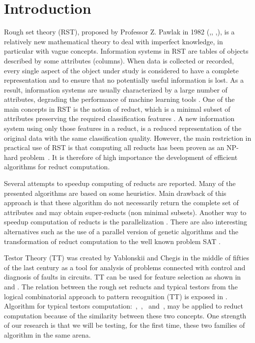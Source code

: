 \documentclass[11pt,authoryear]{elsarticle}
\begin{document}
\section{Introduction}
  Rough set theory (RST), proposed by Professor Z. Pawlak in 1982 (\cite{Pawlak81},\cite{Pawlak81-2},
  \cite{Pawlak82},\cite{Pawlak91}), is a relatively new mathematical theory 
  to deal with imperfect knowledge, in particular with vague concepts. Information systems in RST 
  are tables of objects described by some attributes (columns). 
  When data is collected or recorded, every single aspect of the object under study is considered 
  to have a complete representation and to ensure that no potentially useful information is lost.
  As a result, information systems are usually characterized by a large number of attributes,
  degrading the performance of machine learning tools \cite{Parthalain08}.
  One of the main concepts in RST is the notion of reduct, which is a minimal subset of attributes 
  preserving the required classification features \cite{Pawlak91}. A new information system using 
  only those features in a reduct, is a reduced representation of the original data with the same 
  classification quality. 
  However, the main restriction in practical use of RST is that computing all reducts has been proven 
  as an NP-hard problem~\cite{Skowron92}.
  It is therefore of high importance the development of efficient algorithms for reduct computation.
  
  Several attempts to speedup computing of reducts are reported. Many of the presented algorithms are 
  based on some heuristics. Main drawback of this approach is that these algorithm do not necessarily 
  return the complete set of attributes and may obtain super-reducts (non minimal subsets). Another 
  way to speedup computation of reducts is the parallelization \cite{Strakowski08}. There are also 
  interesting alternatives such as the use of a parallel version of genetic algorithms \cite{Wroblewski98}
  and the transformation of reduct computation to the well known problem SAT \cite{Jensen14}.
  
  Testor Theory (TT) was created by Yablonskii and Chegis in the middle of fifties 
  of the last century as a tool for analysis of problems connected with control and 
  diagnosis of faults in circuits. TT can be used for feature selection as shown in~\cite{Ruiz08}
  and \cite{Martinez01}. The relation between the rough set reducts and typical testors from the
  logical combinatorial approach to pattern recognition (TT) is exposed in \cite{Lazo15}. Algorithm for
  typical testors computation:~\cite{Ruiz85},~\cite{Santiesteban03},~\cite{Sanchez07} and~\cite{Lias09},
  may be applied to reduct computation because of the similarity between these two concepts. One strength 
  of our research is that we will be testing, for the first time, these two families of algorithm in the 
  same arena.
  
\end{document}
